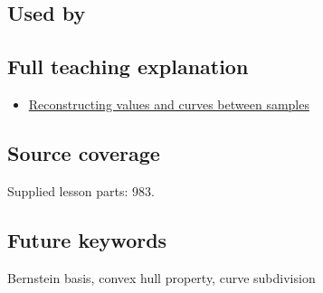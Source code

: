 \subsection{Used by}\label{appendix-ddbec701898c-used-by}

\subsection{Full teaching explanation}\label{appendix-ddbec701898c-full-teaching-explanation}

\begin{itemize}
\tightlist
\item
  \hyperref[02-foundations-ii-ch028-reconstructing-values-and-curves-between-samples]{Reconstructing values and curves between samples}
\end{itemize}

\subsection{Source coverage}\label{appendix-ddbec701898c-source-coverage}

Supplied lesson parts: 983.

\subsection{Future keywords}\label{appendix-ddbec701898c-future-keywords}

Bernstein basis, convex hull property, curve subdivision
